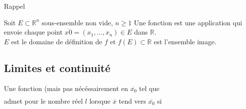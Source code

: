 \begin{parag}{Rappel}
    \begin{definition}
        Soit $E \subset \mathbb{R}^n $ sous-ensemble non vide, $n \geq 1$ Une fonction est une application qui envoie chaque point $ \overline{x0} = (x_1, \dots, x_n) \in E$ dans $ \mathbb{R}$.\\
        $E$ est le domaine de définition de $f$ et $f(E) \subset \mathbb{R}$ est l'ensemble image.
    \end{definition}
    

\end{parag}

\subsection{Limites et continuité}
\begin{definition}
    Une fonction  (mais pas nécéssairement en $ \overline{x_0}$ tel que
    \begin{align*}
        [ \exists \delta > 0: B( \overline{x}_0, \delta) \subset E \cup \{ \overline{x_0}\}]
    \end{align*}
    admet pour  le nombre réel $l$ lorsque $ \overline{x}$ tend vers $ \overline{x_0}$ si  
\end{definition}


